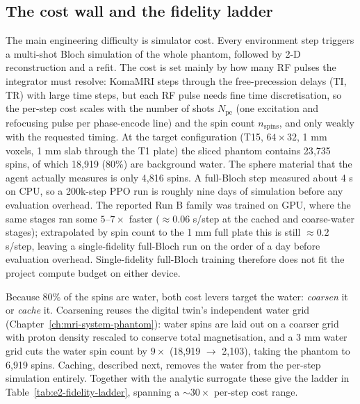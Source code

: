 \subsection{The cost wall and the fidelity ladder}
\label{sec:e2-mf-ladder}


The main engineering difficulty is simulator cost. Every environment step
triggers a multi-shot Bloch simulation of the whole phantom, followed by 2-D
reconstruction and a refit. The cost is set mainly by how many RF pulses the
integrator must resolve: KomaMRI steps through the free-precession delays
(TI, TR) with large time steps, but each RF pulse needs fine time
discretisation, so the per-step cost scales with the number of shots
$N_\mathrm{pe}$ (one excitation and refocusing pulse per phase-encode line) and
the spin count $n_\mathrm{spins}$, and only weakly with the requested timing.
At the target configuration (T15, $64\times32$, 1 mm voxels, 1 mm slab through
the T1 plate) the sliced phantom contains 23{,}735 spins, of which 18{,}919
(80\%) are background water. The sphere material that the agent actually
measures is only 4{,}816 spins. A full-Bloch step measured about 4 s on CPU, so
a 200k-step PPO run is roughly nine days of simulation before any evaluation
overhead. The reported Run B family was trained on GPU, where the same stages
ran some $5$--$7\times$ faster (${\approx}0.06$ s/step at the cached and
coarse-water stages); extrapolated by spin count to the 1 mm full plate this is
still ${\approx}0.2$ s/step, leaving a single-fidelity full-Bloch run on the
order of a day before evaluation overhead. Single-fidelity full-Bloch training
therefore does not fit the project compute budget on either device.

Because 80\% of the spins are water, both cost levers target the water:
\emph{coarsen} it or \emph{cache} it. Coarsening reuses the digital twin's
independent water grid (Chapter~\ref{ch:mri-system-phantom}): water spins are
laid out on a coarser grid with proton density rescaled to conserve total
magnetisation, and a 3 mm water grid cuts the water spin count by $9\times$
(18{,}919 $\to$ 2{,}103), taking the phantom to 6{,}919 spins. Caching,
described next, removes the water from the per-step simulation entirely.
Together with the analytic surrogate these give the ladder in
Table~\ref{tab:e2-fidelity-ladder}, spanning a ${\sim}30\times$ per-step cost
range.

